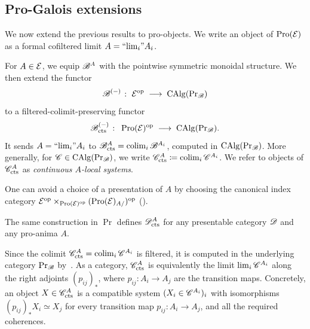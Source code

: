 \documentclass[english,svgnames,table]{article}
\begin{document}
\subsection{Pro-Galois extensions}
\label{subsec:pro-Galois}
    We now extend the previous results to pro-objects. We write an object of $\operatorname{Pro}(\mathcal{E})$ as a formal cofiltered limit $A = \text{``$\lim_{i}$''} A_i$.

    \begin{definition}
    \label{def:continuous-local-systems}
        For $A \in \mathcal{E}$, we equip $\mathscr{B}^A$ with the pointwise symmetric monoidal structure. We then extend the functor 
        \begin{equation*}
            \mathscr{B}^{(-)} \;\colon\; \mathcal{E}^{\mathrm{op}} \;\longrightarrow\; \operatorname{CAlg}(\operatorname{Pr}_{\mathscr{B}})
        \end{equation*}
        to a filtered-colimit-preserving functor
        \begin{equation*}
            \mathscr{B}_{\mathrm{cts}}^{(-)} \;\colon\; \operatorname{Pro}(\mathcal{E})^{\mathrm{op}} \;\longrightarrow\; \operatorname{CAlg}(\operatorname{Pr}_{\mathscr{B}}).
        \end{equation*}
        It sends $A = \text{``$\lim_{i}$''} A_i$ to $\mathscr{B}_{\mathrm{cts}}^A = \operatorname*{colim}_i \mathscr{B}^{A_i}$, computed in $\operatorname{CAlg}(\operatorname{Pr}_{\mathscr{B}})$. 
        More generally, for $\mathscr{C} \in \operatorname{CAlg}(\operatorname{Pr}_{\mathscr{B}})$, we write $\mathscr{C}_{\mathrm{cts}}^A \coloneq \operatorname*{colim}_i \mathscr{C}^{A_i}$. We refer to objects of $\mathscr{C}_{\mathrm{cts}}^A$ as \emph{continuous $A$-local systems}.

        One can avoid a choice of a presentation of $A$ by choosing the canonical index category $\mathcal{E}^{\mathrm{op}} \times_{\operatorname{Pro}(\mathcal{E})^{\mathrm{op}}} (\operatorname{Pro}(\mathcal{E})_{A/})^{\mathrm{op}}$ (\cite[Corollary~5.3.5.4]{Lurie-HTT}).
    \end{definition}

    The same construction in $\Pr$ defines $\mathscr{D}_{\mathrm{cts}}^A$ for any presentable category $\mathscr{D}$ and any pro-anima $A$.


    \begin{remark}
    \label{rmk:filtered-colimit-limit}
        Since the colimit $\mathscr{C}_{\mathrm{cts}}^A = \operatorname*{colim}_i \mathscr{C}^{A_i}$ is filtered, it is computed in the underlying category $\operatorname{Pr}_{\mathscr{B}}$ by~\cite[Corollary~3.2.3.2]{Lurie-HA}. As a category, $\mathscr{C}_{\mathrm{cts}}^A$ is equivalently the limit $\lim_i \mathscr{C}^{A_i}$ along the right adjoints $(p_{ij})_*$, where $p_{ij} \colon A_i \to A_j$ are the transition maps. Concretely, an object $X \in \mathscr{C}_{\mathrm{cts}}^A$ is a compatible system $(X_i \in \mathscr{C}^{A_i})_i$ with isomorphisms $(p_{ij})_* X_i \simeq X_j$ for every transition map $p_{ij} \colon A_i \to A_j$, and all the required coherences.
    \end{remark}
\end{document}
